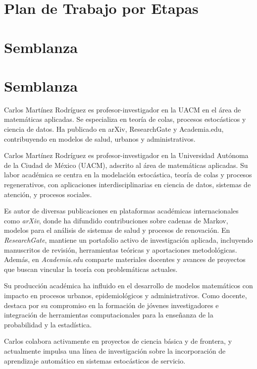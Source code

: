 \documentclass[12pt]{article}
\begin{document}
\section{Plan de Trabajo por Etapas}


\section{Semblanza}

\section{Semblanza}
Carlos Martínez Rodríguez es profesor-investigador en la UACM en el área de matemáticas aplicadas. Se especializa en teoría de colas, procesos estocásticos y ciencia de datos. Ha publicado en arXiv, ResearchGate y Academia.edu, contribuyendo en modelos de salud, urbanos y administrativos.

Carlos Martínez Rodríguez es profesor-investigador en la Universidad Autónoma de la Ciudad de México (UACM), adscrito al área de matemáticas aplicadas. Su labor académica se centra en la modelación estocástica, teoría de colas y procesos regenerativos, con aplicaciones interdisciplinarias en ciencia de datos, sistemas de atención, y procesos sociales.

Es autor de diversas publicaciones en plataformas académicas internacionales como \textit{arXiv}, donde ha difundido contribuciones sobre cadenas de Markov, modelos para el análisis de sistemas de salud y procesos de renovación. En \textit{ResearchGate}, mantiene un portafolio activo de investigación aplicada, incluyendo manuscritos de revisión, herramientas teóricas y aportaciones metodológicas. Además, en \textit{Academia.edu} comparte materiales docentes y avances de proyectos que buscan vincular la teoría con problemáticas actuales.

Su producción académica ha influido en el desarrollo de modelos matemáticos con impacto en procesos urbanos, epidemiológicos y administrativos. Como docente, destaca por su compromiso en la formación de jóvenes investigadores e integración de herramientas computacionales para la enseñanza de la probabilidad y la estadística.

Carlos colabora activamente en proyectos de ciencia básica y de frontera, y actualmente impulsa una línea de investigación sobre la incorporación de aprendizaje automático en sistemas estocásticos de servicio.
\end{document}
